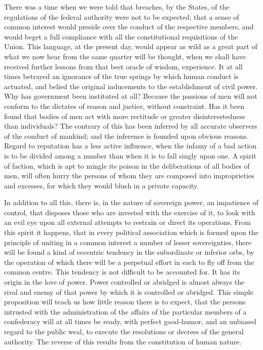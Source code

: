 There was a time when we were told that breaches, by the States, of the regulations of the federal authority were not to be expected; that a sense of common interest would preside over the conduct of the respective members, and would beget a full compliance with all the constitutional requisitions of the Union. This language, at the present day, would appear as wild as a great part of what we now hear from the same quarter will be thought, when we shall have received further lessons from that best oracle of wisdom, experience. It at all times betrayed an ignorance of the true springs by which human conduct is actuated, and belied the original inducements to the establishment of civil power. Why has government been instituted at all? Because the passions of men will not conform to the dictates of reason and justice, without constraint. Has it been found that bodies of men act with more rectitude or greater disinterestedness than individuals? The contrary of this has been inferred by all accurate observers of the conduct of mankind; and the inference is founded upon obvious reasons. Regard to reputation has a less active influence, when the infamy of a bad action is to be divided among a number than when it is to fall singly upon one. A spirit of faction, which is apt to mingle its poison in the deliberations of all bodies of men, will often hurry the persons of whom they are composed into improprieties and excesses, for which they would blush in a private capacity.

In addition to all this, there is, in the nature of sovereign power, an impatience of control, that disposes those who are invested with the exercise of it, to look with an evil eye upon all external attempts to restrain or direct its operations. From this spirit it happens, that in every political association which is formed upon the principle of uniting in a common interest a number of lesser sovereignties, there will be found a kind of eccentric tendency in the subordinate or inferior orbs, by the operation of which there will be a perpetual effort in each to fly off from the common centre. This tendency is not difficult to be accounted for. It has its origin in the love of power. Power controlled or abridged is almost always the rival and enemy of that power by which it is controlled or abridged. This simple proposition will teach us how little reason there is to expect, that the persons intrusted with the administration of the affairs of the particular members of a confederacy will at all times be ready, with perfect good-humor, and an unbiased regard to the public weal, to execute the resolutions or decrees of the general authority. The reverse of this results from the constitution of human nature.

